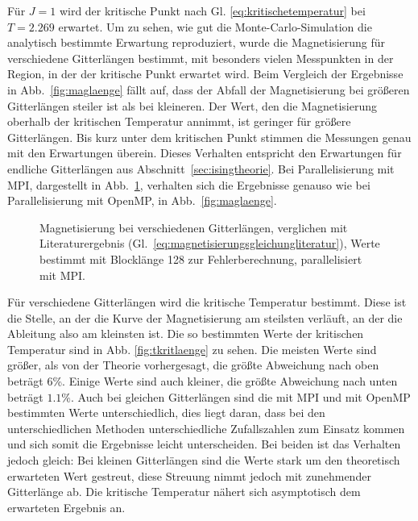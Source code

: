	
	Für $J=1$ wird der kritische Punkt nach Gl. \ref{eq:kritischetemperatur} bei $T=\num{2,269}$ erwartet.
	Um zu sehen, wie gut die Monte-Carlo-Simulation die analytisch bestimmte Erwartung reproduziert, wurde die Magnetisierung für verschiedene Gitterlängen bestimmt, mit besonders vielen Messpunkten in der Region, in der der kritische Punkt erwartet wird. Beim Vergleich der Ergebnisse in Abb.~\ref{fig:maglaenge} fällt auf, dass der Abfall der Magnetisierung bei größeren Gitterlängen steiler ist als bei kleineren. Der Wert, den die Magnetisierung oberhalb der kritischen Temperatur annimmt, ist geringer für größere Gitterlängen. Bis kurz unter dem kritischen Punkt stimmen die Messungen genau mit den Erwartungen überein. Dieses Verhalten entspricht den Erwartungen für endliche Gitterlängen aus Abschnitt~\ref{sec:isingtheorie}. Bei Parallelisierung mit MPI, dargestellt in Abb.~\ref{fig:maglaengempi}, verhalten sich die Ergebnisse genauso wie bei Parallelisierung mit OpenMP, in Abb.~\ref{fig:maglaenge}.
	
	
	\begin{figure}[htbp]
		
		\caption[Magnetisierung bei verschiedenen Gitterlängen und Verwendung von MPI]{Magnetisierung bei verschiedenen Gitterlängen, verglichen mit Literaturergebnis (Gl.~\ref{eq:magnetisierungsgleichungliteratur}), Werte bestimmt mit Blocklänge 128 zur Fehlerberechnung, parallelisiert mit MPI.}
		\label{fig:maglaengempi}
	\end{figure}

	Für verschiedene Gitterlängen wird die kritische Temperatur bestimmt. Diese ist die Stelle, an der die Kurve der Magnetisierung am steilsten verläuft, an der die Ableitung also am kleinsten ist. Die so bestimmten Werte der kritischen Temperatur sind in Abb. \ref{fig:tkritlaenge} zu sehen. Die meisten Werte sind größer, als von der Theorie vorhergesagt, die größte Abweichung nach oben beträgt 6\%. Einige Werte sind auch kleiner, die größte Abweichung nach unten beträgt $\num{1,1}\%$. Auch bei gleichen Gitterlängen sind die mit MPI und mit OpenMP bestimmten Werte unterschiedlich, dies liegt daran, dass bei den unterschiedlichen Methoden unterschiedliche Zufallszahlen zum Einsatz kommen und sich somit die Ergebnisse leicht unterscheiden. Bei beiden ist das Verhalten jedoch gleich: Bei kleinen Gitterlängen sind die Werte stark um den theoretisch erwarteten Wert gestreut, diese Streuung nimmt jedoch mit zunehmender Gitterlänge ab. Die kritische Temperatur nähert sich asymptotisch dem erwarteten Ergebnis an.
	
